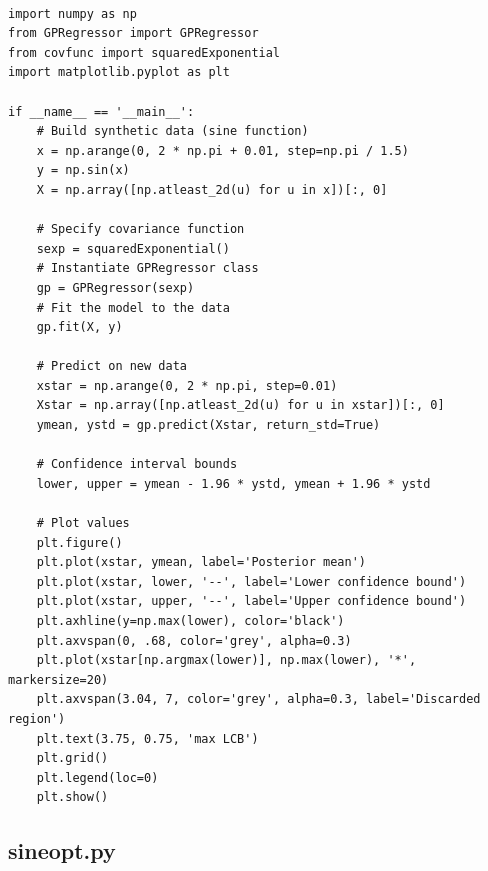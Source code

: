 \documentclass[10pt,a4paper,twoside]{book}
\begin{document}
\begin{verbatim}

import numpy as np
from GPRegressor import GPRegressor
from covfunc import squaredExponential
import matplotlib.pyplot as plt

if __name__ == '__main__':
    # Build synthetic data (sine function)
    x = np.arange(0, 2 * np.pi + 0.01, step=np.pi / 1.5)
    y = np.sin(x)
    X = np.array([np.atleast_2d(u) for u in x])[:, 0]

    # Specify covariance function
    sexp = squaredExponential()
    # Instantiate GPRegressor class
    gp = GPRegressor(sexp)
    # Fit the model to the data
    gp.fit(X, y)

    # Predict on new data
    xstar = np.arange(0, 2 * np.pi, step=0.01)
    Xstar = np.array([np.atleast_2d(u) for u in xstar])[:, 0]
    ymean, ystd = gp.predict(Xstar, return_std=True)

    # Confidence interval bounds
    lower, upper = ymean - 1.96 * ystd, ymean + 1.96 * ystd

    # Plot values
    plt.figure()
    plt.plot(xstar, ymean, label='Posterior mean')
    plt.plot(xstar, lower, '--', label='Lower confidence bound')
    plt.plot(xstar, upper, '--', label='Upper confidence bound')
    plt.axhline(y=np.max(lower), color='black')
    plt.axvspan(0, .68, color='grey', alpha=0.3)
    plt.plot(xstar[np.argmax(lower)], np.max(lower), '*', markersize=20)
    plt.axvspan(3.04, 7, color='grey', alpha=0.3, label='Discarded region')
    plt.text(3.75, 0.75, 'max LCB')
    plt.grid()
    plt.legend(loc=0)
    plt.show()                      
\end{verbatim}

\subsection*{sineopt.py}
\label{sineopt}
\end{document}

